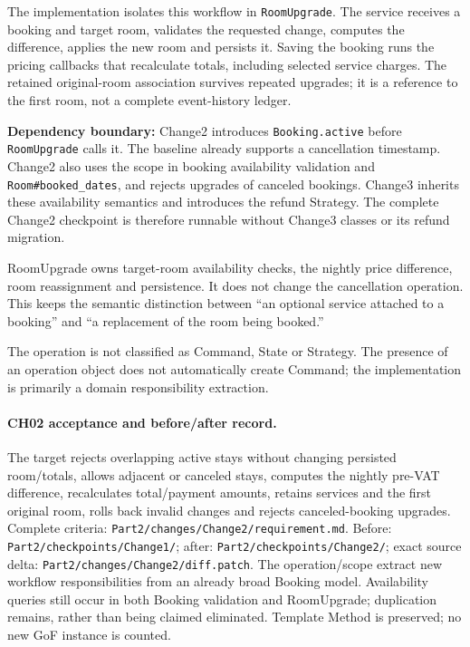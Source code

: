 \documentclass[10pt,a4paper]{article}
\newcommand{\code}[1]{\texttt{\small #1}}
\begin{document}
The implementation isolates this workflow in \code{RoomUpgrade}. The service receives a booking and target room, validates the requested change, computes the difference, applies the new room and persists it. Saving the booking runs the pricing callbacks that recalculate totals, including selected service charges. The retained original-room association survives repeated upgrades; it is a reference to the first room, not a complete event-history ledger.

\textbf{Dependency boundary:} Change2 introduces \code{Booking.active} before \code{RoomUpgrade} calls it. The baseline already supports a cancellation timestamp. Change2 also uses the scope in booking availability validation and \code{Room\#booked\_dates}, and rejects upgrades of canceled bookings. Change3 inherits these availability semantics and introduces the refund Strategy. The complete Change2 checkpoint is therefore runnable without Change3 classes or its refund migration.

RoomUpgrade owns target-room availability checks, the nightly price difference, room reassignment and persistence. It does not change the cancellation operation. This keeps the semantic distinction between ``an optional service attached to a booking'' and ``a replacement of the room being booked.''

The operation is not classified as Command, State or Strategy. The presence of an operation object does not automatically create Command; the implementation is primarily a domain responsibility extraction.

\paragraph{CH02 acceptance and before/after record.}
The target rejects overlapping active stays without changing persisted room/totals, allows adjacent or canceled stays, computes the nightly pre-VAT difference, recalculates total/payment amounts, retains services and the first original room, rolls back invalid changes and rejects canceled-booking upgrades. Complete criteria: \code{Part2/changes/Change2/requirement.md}. Before: \code{Part2/checkpoints/Change1/}; after: \code{Part2/checkpoints/Change2/}; exact source delta: \code{Part2/changes/Change2/diff.patch}. The operation/scope extract new workflow responsibilities from an already broad Booking model. Availability queries still occur in both Booking validation and RoomUpgrade; duplication remains, rather than being claimed eliminated. Template Method is preserved; no new GoF instance is counted.
\end{document}
